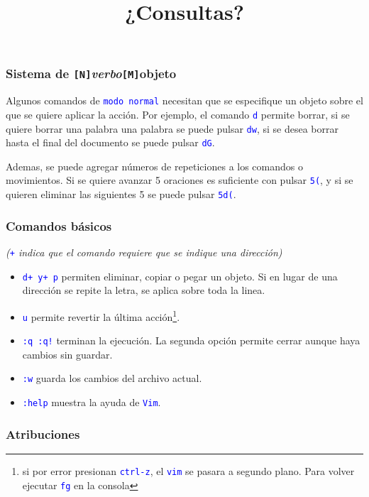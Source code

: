 \documentclass[11pt,a4paper,spanish]{beamer}
\newcommand{\cw}[1]{\mbox{\texttt{\textcolor{blue}{#1}}}}
\begin{document}
\begin{frame}

    \frametitle{Sistema de \texttt{[N]}\emph{verbo}\texttt{[M]}\textbf{objeto}}

    Algunos comandos de \cw{modo normal} necesitan que se especifique un
    objeto sobre el que se quiere aplicar la acción. Por ejemplo, el comando
    \cw{d} permite borrar, si se quiere borrar una palabra una palabra se
    puede pulsar \cw{dw}, si se desea borrar hasta el final del documento se
    puede pulsar \cw{dG}.

    Ademas, se puede agregar números de repeticiones a los comandos o
    movimientos. Si se quiere avanzar 5 oraciones es suficiente con pulsar
    \cw{5(}, y si se quieren eliminar las siguientes 5 se puede pulsar
    \cw{5d(}.

\end{frame}

\begin{frame}

    \frametitle{Comandos básicos}

    \emph{(\cw{+} indica que el comando requiere que se indique una
    dirección)}
    \begin{itemize}
        \item \cw{d+ y+ p} permiten eliminar, copiar o pegar un objeto. Si en
            lugar de una dirección se repite la letra, se aplica sobre toda la
            linea.
        \item \cw{u} permite revertir la última acción\footnote{si por error
            presionan \cw{ctrl-z}, el \cw{vim} se pasara a segundo plano. Para
            volver ejecutar \cw{fg} en la consola}.
        \item \cw{:q :q!} terminan la ejecución. La segunda opción permite
            cerrar aunque haya cambios sin guardar.
        \item \cw{:w} guarda los cambios del archivo actual.
        \item \cw{:help} muestra la ayuda de \cw{Vim}.
    \end{itemize}

\end{frame}


\begin{frame}

\title{¿Consultas?}
\maketitle

\end{frame}

\setcounter{lastPage}{\number\value{page}}

\begin{frame}%

\frametitle{Atribuciones}


\tiny

\end{frame}

\setcounter{page}{\number\value{lastPage}}
\end{document}
